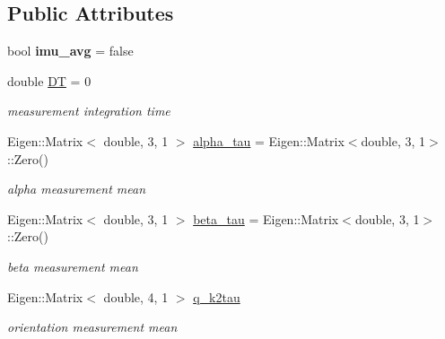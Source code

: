 \subsection*{Public Attributes}
\begin{DoxyCompactItemize}
\item 
\mbox{\label{classov__core_1_1CpiBase_a44b409fc4abd74901b30813a0aeef868}} 
bool {\bfseries imu\+\_\+avg} = false
\item 
\mbox{\label{classov__core_1_1CpiBase_a0c28fb509ed55ef7ba4957735490a0e7}} 
double \hyperlink{classov__core_1_1CpiBase_a0c28fb509ed55ef7ba4957735490a0e7}{DT} = 0
\begin{DoxyCompactList}\small\item\em measurement integration time \end{DoxyCompactList}\item 
\mbox{\label{classov__core_1_1CpiBase_adb27448c25850a08a47d02184cfee45e}} 
Eigen\+::\+Matrix$<$ double, 3, 1 $>$ \hyperlink{classov__core_1_1CpiBase_adb27448c25850a08a47d02184cfee45e}{alpha\+\_\+tau} = Eigen\+::\+Matrix$<$double, 3, 1$>$\+::Zero()
\begin{DoxyCompactList}\small\item\em alpha measurement mean \end{DoxyCompactList}\item 
\mbox{\label{classov__core_1_1CpiBase_a948805010b85aab837fd7414ca8dc8c5}} 
Eigen\+::\+Matrix$<$ double, 3, 1 $>$ \hyperlink{classov__core_1_1CpiBase_a948805010b85aab837fd7414ca8dc8c5}{beta\+\_\+tau} = Eigen\+::\+Matrix$<$double, 3, 1$>$\+::Zero()
\begin{DoxyCompactList}\small\item\em beta measurement mean \end{DoxyCompactList}\item 
\mbox{\label{classov__core_1_1CpiBase_a9fdb4dd0a3c7c68f39464b26a71ab1cf}} 
Eigen\+::\+Matrix$<$ double, 4, 1 $>$ \hyperlink{classov__core_1_1CpiBase_a9fdb4dd0a3c7c68f39464b26a71ab1cf}{q\+\_\+k2tau}
\begin{DoxyCompactList}\small\item\em orientation measurement mean \end{DoxyCompactList}\item 

\end{DoxyCompactItemize}
